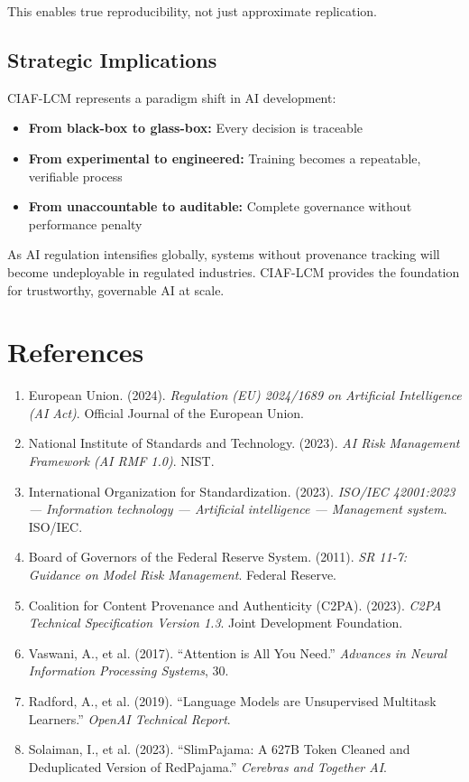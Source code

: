 \documentclass[11pt,a4paper]{article}
\begin{document}
This enables true reproducibility, not just approximate replication.

\subsection{Strategic Implications}

CIAF-LCM represents a paradigm shift in AI development:

\begin{itemize}
    \item \textbf{From black-box to glass-box:} Every decision is traceable
    \item \textbf{From experimental to engineered:} Training becomes a repeatable, verifiable process
    \item \textbf{From unaccountable to auditable:} Complete governance without performance penalty
\end{itemize}

As AI regulation intensifies globally, systems without provenance tracking will become undeployable in regulated industries. CIAF-LCM provides the foundation for trustworthy, governable AI at scale.

\section{References}

\begin{enumerate}
    \item European Union. (2024). \textit{Regulation (EU) 2024/1689 on Artificial Intelligence (AI Act)}. Official Journal of the European Union.
    
    \item National Institute of Standards and Technology. (2023). \textit{AI Risk Management Framework (AI RMF 1.0)}. NIST.
    
    \item International Organization for Standardization. (2023). \textit{ISO/IEC 42001:2023 — Information technology — Artificial intelligence — Management system}. ISO/IEC.
    
    \item Board of Governors of the Federal Reserve System. (2011). \textit{SR 11-7: Guidance on Model Risk Management}. Federal Reserve.
    
    \item Coalition for Content Provenance and Authenticity (C2PA). (2023). \textit{C2PA Technical Specification Version 1.3}. Joint Development Foundation.
    
    \item Vaswani, A., et al. (2017). ``Attention is All You Need.'' \textit{Advances in Neural Information Processing Systems}, 30.
    
    \item Radford, A., et al. (2019). ``Language Models are Unsupervised Multitask Learners.'' \textit{OpenAI Technical Report}.
    
    \item Solaiman, I., et al. (2023). ``SlimPajama: A 627B Token Cleaned and Deduplicated Version of RedPajama.'' \textit{Cerebras and Together AI}.
\end{enumerate}
\end{document}
